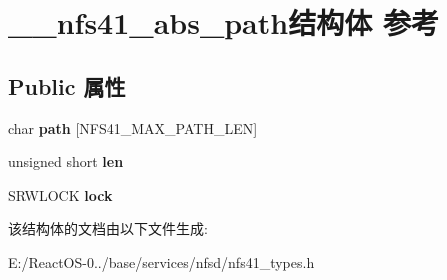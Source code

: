 \hypertarget{struct____nfs41__abs__path}{}\section{\+\_\+\+\_\+nfs41\+\_\+abs\+\_\+path结构体 参考}
\label{struct____nfs41__abs__path}
\subsection*{Public 属性}
\begin{DoxyCompactItemize}
\item 
\mbox{\label{struct____nfs41__abs__path_a57936d8ee29520fa4fa7d898e134ac54}} 
char {\bfseries path} \mbox{[}N\+F\+S41\+\_\+\+M\+A\+X\+\_\+\+P\+A\+T\+H\+\_\+\+L\+EN\mbox{]}
\item 
\mbox{\label{struct____nfs41__abs__path_aa18afe6a3dc0a3b4a1c21692f107ee37}} 
unsigned short {\bfseries len}
\item 
\mbox{\label{struct____nfs41__abs__path_ae35cc584b0aa2b89a206ade3a0306ce2}} 
S\+R\+W\+L\+O\+CK {\bfseries lock}
\end{DoxyCompactItemize}


该结构体的文档由以下文件生成\+:\begin{DoxyCompactItemize}
\item 
E\+:/\+React\+O\+S-\/0../base/services/nfsd/nfs41\+\_\+types.\+h\end{DoxyCompactItemize}
